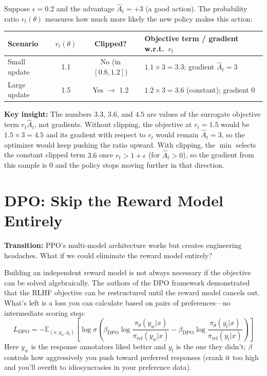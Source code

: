 \documentclass[12pt,a4paper]{report}
\theoremstyle{definition}
\begin{document}
\begin{tcolorbox}[colback=gray!5!white, colframe=gray!60!black, title=\textbf{Worked Example: PPO Clipping in Action}]
\small
Suppose $\epsilon = 0.2$ and the advantage $\hat{A}_t = +3$ (a good action). The probability ratio $r_t(\theta)$ measures how much more likely the new policy makes this action:

\begin{center}
\begin{tabular}{lccl}
\toprule
\textbf{Scenario} & $r_t(\theta)$ & \textbf{Clipped?} & \textbf{Objective term / gradient w.r.t.\ $r_t$} \\
\midrule
Small update & 1.1 & No (in $[0.8, 1.2]$) & $1.1 \times 3 = 3.3$; gradient $\hat{A}_t = 3$ \\
Large update & 1.5 & Yes $\rightarrow$ 1.2 & $1.2 \times 3 = 3.6$ (constant); gradient $0$ \\
\bottomrule
\end{tabular}
\end{center}

\textbf{Key insight:} The numbers $3.3$, $3.6$, and $4.5$ are values of the surrogate objective term $r_t\hat{A}_t$, not gradients. Without clipping, the objective at $r_t = 1.5$ would be $1.5 \times 3 = 4.5$ and its gradient with respect to $r_t$ would remain $\hat{A}_t = 3$, so the optimizer would keep pushing the ratio upward. With clipping, the $\min$ selects the constant clipped term $3.6$ once $r_t > 1+\epsilon$ (for $\hat{A}_t>0$), so the gradient from this sample is $0$ and the policy stops moving further in that direction.
\end{tcolorbox}

\section{DPO: Skip the Reward Model Entirely}
\label{sec:dpo}
\textbf{Transition:} PPO's multi-model architecture works but creates engineering headaches. What if we could eliminate the reward model entirely?

Building an independent reward model is not always necessary if the objective can be solved algebraically. The authors of the DPO framework \cite{rafailov2023direct} demonstrated that the RLHF objective can be restructured until the reward model cancels out. What's left is a loss you can calculate based on pairs of preferences---no intermediate scoring step:
\begin{equation}
L_{\text{DPO}} = -\mathbb{E}_{(x,y_w,y_l)} \left[ \log \sigma \left( \beta_{\text{DPO}} \log \frac{\pi_\theta(y_w|x)}{\pi_{\text{ref}}(y_w|x)} - \beta_{\text{DPO}} \log \frac{\pi_\theta(y_l|x)}{\pi_{\text{ref}}(y_l|x)} \right) \right]
\end{equation}
Here $y_w$ is the response annotators liked better and $y_l$ is the one they didn't; $\beta$ controls how aggressively you push toward preferred responses (crank it too high and you'll overfit to idiosyncrasies in your preference data).
\end{document}
